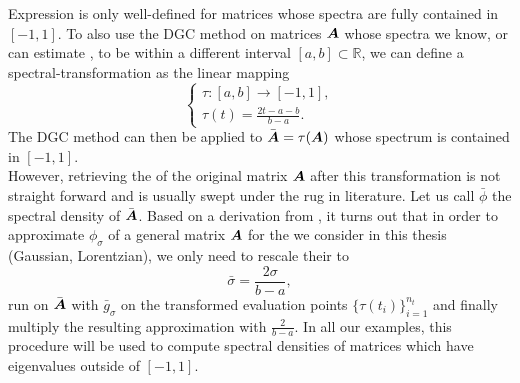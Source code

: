 Expression  is only well-defined for matrices whose spectra are fully
contained in $[-1, 1]$. To also use the \gls{DGC} method on matrices $\boldsymbol{A}$ whose
spectra we know, or can estimate \cite{lin2016review, zhou2011spectrum}, to be
within a different interval $[a, b] \subset \mathbb{R}$,
we can define a \gls{spectral-transformation} as the linear mapping
\begin{equation}
    \begin{cases}
        \tau : [a, b] \to [-1, 1], \\
        \tau(t) = \frac{2t - a - b}{b - a}.
    \end{cases}
    \label{equ:2-chebyshev-spectral-transformation}
\end{equation}
The \gls{DGC} method can then be applied to $\bar{\boldsymbol{A}} = \tau(\boldsymbol{A})$ whose
spectrum is contained in $[-1, 1]$.\\

However, retrieving the  of the original
matrix $\boldsymbol{A}$ after this transformation is not straight forward
and is usually swept under the rug in literature.
Let us call $\bar{\phi}$ the spectral density of $\bar{\boldsymbol{A}}$.
Based on a derivation from , it turns out that in order
to approximate $\phi_{\sigma}$ of a general matrix $\boldsymbol{A}$
for the  we consider
in this thesis (Gaussian, Lorentzian), we only need to rescale their
 to
\begin{equation}
    \bar{\sigma} = \frac{2\sigma}{b - a},
    \label{equ:2-chebyshev-sigma-transformation}
\end{equation}
run  on $\bar{\boldsymbol{A}}$ with $\bar{g}_{\sigma}$
on the transformed evaluation points $\{ \tau(t_i) \}_{i=1}^{n_t}$ and finally
multiply the resulting approximation with $\frac{2}{b-a}$.
In all our examples, this procedure will be used to compute spectral densities
of matrices which have eigenvalues outside of $[-1, 1]$.\\

